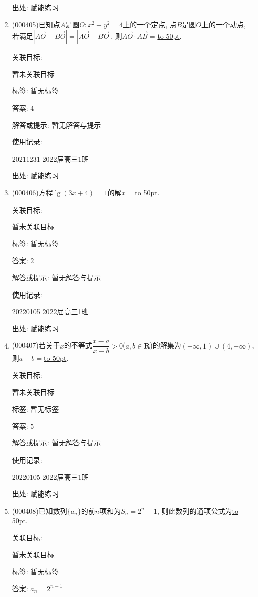 \documentclass[10pt,a4paper]{article}
\newcommand{\blank}[1]{\underline{\hbox to #1pt{}}}
\begin{document}
\begin{enumerate}[1.]
出处: 赋能练习
\item { (000405)}已知点$A$是圆$O: x^2+y^2=4$上的一个定点, 点$B$是圆$O$上的一个动点, 若满足$|\overrightarrow{AO}+\overrightarrow{BO}|=|\overrightarrow{AO}-\overrightarrow{BO}|$, 则$\overrightarrow{AO}\cdot \overrightarrow{AB}=$\blank{50}.


关联目标:

暂未关联目标



标签: 暂无标签

答案: $4$

解答或提示: 暂无解答与提示

使用记录:

20211231	2022届高三1班	


出处: 赋能练习
\item { (000406)}方程$\lg (3x+4)=1$的解$x=$\blank{50}.


关联目标:

暂未关联目标



标签: 暂无标签

答案: $2$

解答或提示: 暂无解答与提示

使用记录:

20220105	2022届高三1班	


出处: 赋能练习
\item { (000407)}若关于$x$的不等式$\dfrac{x-a}{x-b}>0$($a,b\in \mathbf{R}$)的解集为$(-\infty ,1)\cup (4,+\infty)$, 则$a+b=$\blank{50}.


关联目标:

暂未关联目标



标签: 暂无标签

答案: $5$

解答或提示: 暂无解答与提示

使用记录:

20220105	2022届高三1班	


出处: 赋能练习
\item { (000408)}已知数列$\{a_n\}$的前$n$项和为$S_n=2^n-1$, 则此数列的通项公式为\blank{50}.


关联目标:

暂未关联目标



标签: 暂无标签

答案: $a_n=2^{n-1}$


\end{enumerate}
\end{document}
